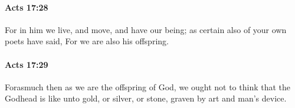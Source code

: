 		\paragraph{Acts 17:28} %
			\label{ACTS-17-28}

			For in him we live, and move, and have our being; as certain also of your own poets have said, For we are also his offspring.

			\begin{framed}
			\scriptsize
				\begin{compactdesc}
					\item[SBLG] 
				\end{compactdesc}
			\end{framed}

		\paragraph{Acts 17:29} %
			\label{ACTS-17-29}

			Forasmuch then as we are the offspring of God, we ought not to think that the Godhead is like unto gold, or silver, or stone, graven by art and man's device.

